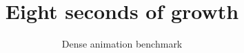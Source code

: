 \documentclass[aspectratio=169]{beamer}
\title{Eight seconds of growth}\author{Dense animation benchmark}\date{}
\begin{document}
\begin{frame}[plain]\titlepage\end{frame}
\end{document}
